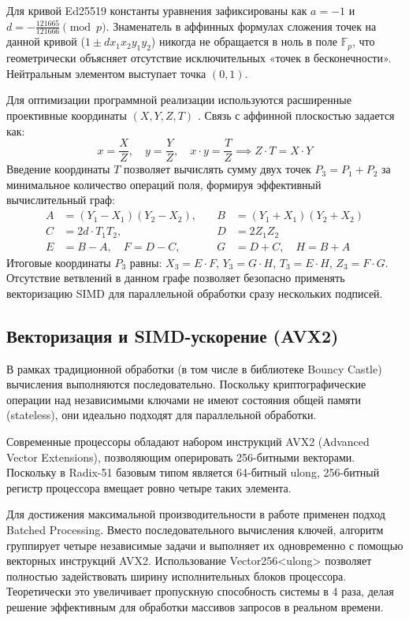 Для кривой Ed25519 константы уравнения зафиксированы как $a = -1$ и $d = -\frac{121665}{121666} \pmod p$. Знаменатель в аффинных формулах сложения точек на данной кривой ($1 \pm d x_1 x_2 y_1 y_2$) никогда не обращается в ноль в поле $\mathbb{F}_p$, что геометрически объясняет отсутствие исключительных «точек в бесконечности». Нейтральным элементом выступает точка $(0, 1)$.

Для оптимизации программной реализации используются расширенные проективные координаты $(X, Y, Z, T)$ \cite{RFC8032}. Связь с аффинной плоскостью задается как:
\begin{equation}
    x = \frac{X}{Z}, \quad y = \frac{Y}{Z}, \quad x \cdot y = \frac{T}{Z} \implies Z \cdot T = X \cdot Y
\end{equation}
Введение координаты $T$ позволяет вычислять сумму двух точек $P_3 = P_1 + P_2$ за минимальное количество операций поля, формируя эффективный вычислительный граф:
\begin{equation}
\begin{aligned}
    A &= (Y_1 - X_1)(Y_2 - X_2), \quad &B &= (Y_1 + X_1)(Y_2 + X_2) \\
    C &= 2d \cdot T_1 T_2, \quad &D &= 2 Z_1 Z_2 \\
    E &= B - A, \quad F = D - C, \quad &G &= D + C, \quad H = B + A
\end{aligned}
\end{equation}
Итоговые координаты $P_3$ равны: $X_3 = E \cdot F$, $Y_3 = G \cdot H$, $T_3 = E \cdot H$, $Z_3 = F \cdot G$. Отсутствие ветвлений в данном графе позволяет безопасно применять векторизацию SIMD для параллельной обработки сразу нескольких подписей.

\subsection{Векторизация и SIMD-ускорение (AVX2)}

В рамках традиционной обработки (в том числе в библиотеке Bouncy Castle) вычисления выполняются последовательно. 
Поскольку криптографические операции над независимыми ключами не имеют состояния общей памяти (stateless), они идеально подходят для параллельной обработки.

Современные процессоры обладают набором инструкций AVX2 (Advanced Vector Extensions), позволяющим оперировать 256-битными векторами. 
Поскольку в Radix-51 базовым типом является 64-битный ulong, 256-битный регистр процессора вмещает ровно четыре таких элемента.

Для достижения максимальной производительности в работе применен подход Batched Processing. 
Вместо последовательного вычисления ключей, алгоритм группирует четыре независимые задачи и выполняет их одновременно с помощью векторных инструкций AVX2.
 Использование Vector256<ulong> позволяет полностью задействовать ширину исполнительных блоков процессора. 
Теоретически это увеличивает пропускную способность системы в 4 раза, делая решение эффективным для обработки массивов запросов в реальном времени.